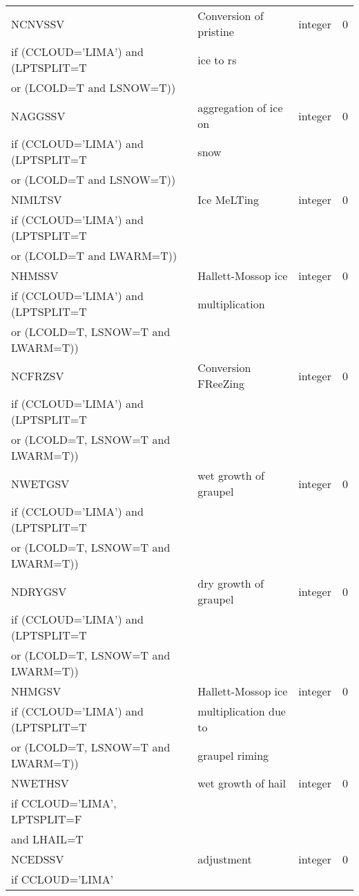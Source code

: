 \begin{longtable} {|p{}|p{}|>{\centering}p{}|p{}<{\centering}|}
NCNVSSV & Conversion of pristine & integer & 0 \\ \nopagebreak
if (CCLOUD='LIMA') and (LPTSPLIT=T &ice to rs && \\ \nopagebreak
or (LCOLD=T and LSNOW=T)) &&& \\\hline

NAGGSSV & aggregation of ice on  & integer & 0 \\ \nopagebreak
if (CCLOUD='LIMA') and (LPTSPLIT=T & snow&& \\ \nopagebreak
or (LCOLD=T and LSNOW=T)) &&& \\\hline

NIMLTSV & Ice MeLTing & integer & 0 \\ \nopagebreak
if (CCLOUD='LIMA') and (LPTSPLIT=T &&& \\ \nopagebreak
or (LCOLD=T and LWARM=T)) &&& \\\hline

NHMSSV & Hallett-Mossop ice  & integer & 0 \\ \nopagebreak
if (CCLOUD='LIMA') and (LPTSPLIT=T &multiplication&& \\ \nopagebreak
or (LCOLD=T, LSNOW=T and LWARM=T)) &&& \\\hline

NCFRZSV & Conversion FReeZing & integer & 0 \\ \nopagebreak
if (CCLOUD='LIMA') and (LPTSPLIT=T &&& \\ \nopagebreak
or (LCOLD=T, LSNOW=T and LWARM=T)) &&& \\\hline

NWETGSV & wet growth of graupel & integer & 0 \\ \nopagebreak
if (CCLOUD='LIMA') and (LPTSPLIT=T &&& \\ \nopagebreak
or (LCOLD=T, LSNOW=T and LWARM=T)) &&& \\\hline

NDRYGSV & dry growth of graupel & integer & 0 \\ \nopagebreak
if (CCLOUD='LIMA') and (LPTSPLIT=T &&& \\ \nopagebreak
or (LCOLD=T, LSNOW=T and LWARM=T)) &&& \\\hline

NHMGSV & Hallett-Mossop ice   & integer & 0 \\ \nopagebreak
if (CCLOUD='LIMA') and (LPTSPLIT=T &multiplication due to && \\ \nopagebreak
or (LCOLD=T, LSNOW=T and LWARM=T)) &graupel riming&& \\\hline

NWETHSV & wet growth of hail& integer & 0 \\ \nopagebreak
if CCLOUD='LIMA', LPTSPLIT=F &&& \\ \nopagebreak
and LHAIL=T &&& \\\hline

NCEDSSV & adjustment & integer & 0 \\ \nopagebreak
if CCLOUD='LIMA' &&& \\\hline
\end{longtable}


